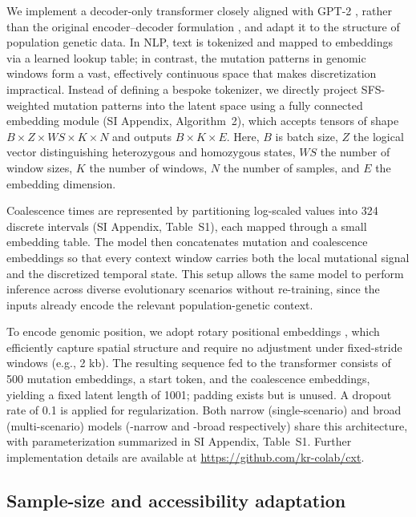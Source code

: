 \documentclass[9pt,twocolumn,twoside]{pnas-new}
\begin{document}
{We implement a decoder-only transformer closely aligned with GPT-2 \cite{radford_language_2019}, 
rather than the original encoder–decoder formulation \cite{vaswani_attention_2017}, 
and adapt it to the structure of population genetic data. 
In NLP, text is tokenized and mapped to embeddings via a learned lookup table; 
in contrast, the mutation patterns in genomic windows form a vast,
effectively continuous space that makes discretization impractical. 
Instead of defining a bespoke tokenizer,
we directly project SFS-weighted mutation patterns into the latent space using a fully connected embedding module (SI Appendix, Algorithm~2),
which accepts tensors of shape $B \times Z \times WS \times K \times N$ and outputs $B \times K \times E$. 
Here, $B$ is batch size, $Z$ the logical vector distinguishing heterozygous and homozygous states, $WS$ the number of window sizes, $K$ the number of windows, $N$ the number of samples, and $E$ the embedding dimension.

Coalescence times are represented by partitioning log-scaled values into 324 discrete intervals (SI Appendix, Table~S1), each mapped through a small embedding table. 
The model then concatenates mutation and coalescence embeddings
so that every context window carries both the local mutational signal and the discretized temporal state. 
This setup allows the same model to perform inference across diverse evolutionary scenarios without re-training, 
since the inputs already encode the relevant population-genetic context.

To encode genomic position, we adopt rotary positional embeddings \cite{su_roformer_2023},
which efficiently capture spatial structure and require no adjustment under fixed-stride windows (e.g., 2 kb).
The resulting sequence fed to the transformer consists of 500 mutation embeddings, a start token, 
and the coalescence embeddings, yielding a fixed latent length of 1001; padding exists but is unused. 
A dropout rate of 0.1 is applied for regularization. 
Both narrow (single-scenario) and broad (multi-scenario) models (\cxtkit-narrow and \cxtkit-broad respectively) share this architecture, 
with parameterization summarized in SI Appendix, Table~S1. 
Further implementation details are available at \url{https://github.com/kr-colab/cxt}.

\subsection*{Sample-size and accessibility adaptation}
\label{sec:adapter}

}
\end{document}
